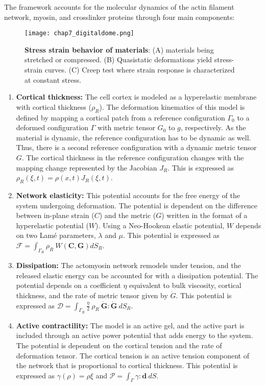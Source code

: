 The framework accounts for the molecular dynamics of the actin filament
network, myosin, and crosslinker proteins through four main components:

\begin{figure}
	\centering
	\texttt{[image: chap7\_digitaldome.png]}
	\caption{\label{fig_7_2} \textbf{Stress strain behavior of materials}: (A) materials being stretched or compressed. (B) Quasistatic deformations yield stress-strain curves. (C) Creep test where strain response is characterized at constant stress.
	}
\end{figure}

\begin{enumerate}
	\def\labelenumi{\arabic{enumi}.}
	\item
	\textbf{Cortical thickness:} The cell cortex is modeled as a
	hyperelastic membrane with cortical thickness (\(\rho_R\)). The
	deformation kinematics of this model is defined by mapping a cortical
	patch from a reference configuration \(\Gamma_0\) to a deformed
	configuration \(\Gamma\) with metric tensor \(G_0\) to \(g\),
	respectively. As the material is dynamic, the reference configuration
	has to be dynamic as well. Thus, there is a second reference
	configuration with a dynamic metric tensor \(G\). The cortical
	thickness in the reference configuration changes with the mapping
	change represented by the Jacobian \(J_R\). This is expressed as
	\(\rho_R(\xi, t) = \rho(x,t)J_R(\xi,t)\).
	\item
	\textbf{Network elasticity:} This potential accounts for the free
	energy of the system undergoing deformation. The potential is
	dependent on the difference between in-plane strain (\(C\)) and the
	metric (\(G\)) written in the format of a hyperelastic potential
	(\(W\)). Using a Neo-Hookean elastic potential, \(W\) depends on two
	Lamé parameters, \(\lambda\) and \(\mu\). This potential is expressed
	as \(\mathcal{F} = \int_{\Gamma_R} \rho_R \ W(\mathbf{C,G})dS_R\).
	\item
	\textbf{Dissipation:} The actomyosin network remodels under tension,
	and the released elastic energy can be accounted for with a
	dissipation potential. The potential depends on a coefficient \(\eta\)
	equivalent to bulk viscosity, cortical thickness, and the rate of
	metric tensor given by \(\dot{G}\). This potential is expressed as
	\(\mathcal{D} = \int_{\Gamma_R} \frac{\eta}{2}\ \rho_R \ \mathbf{\dot{G}}:\mathbf{\dot{G}} \ dS_R\).
	\item
	\textbf{Active contractility:} The model is an active gel, and the
	active part is included through an active power potential that adds
	energy to the system. The potential is dependent on the cortical
	tension and the rate of deformation tensor. The cortical tension is an
	active tension component of the network that is proportional to
	cortical thickness. This potential is expressed as
	\(\gamma(\rho) = \rho \xi\) and
	\(\mathcal{P} = \int_{\Gamma} \gamma : \mathbf{d} \ dS\).
\end{enumerate}

